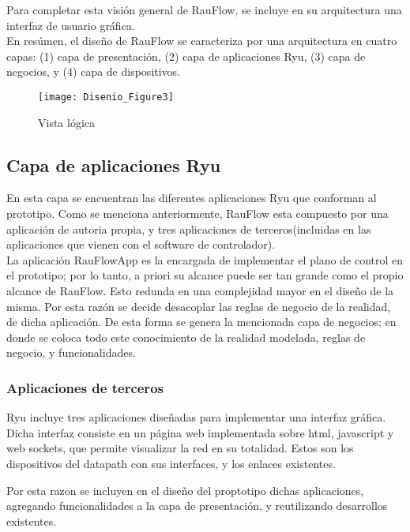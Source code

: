 Para completar esta visi\'on general de RauFlow, se incluye en su arquitectura una interfaz de usuario gr\'afica.\\ 

En res\'umen, el dise\~no de RauFlow se caracteriza por una arquitectura en cuatro capas: (1) capa de presentación, (2) capa de aplicaciones Ryu, (3) capa de negocios, y (4) capa de dispositivos.\\

\newpage
\begin{figure}[ht!] 
\centering    
\texttt{[image: Disenio\_Figure3]}
\caption[Vista l\'ogica]{Vista l\'ogica}
\label{fig:VistaComponentes2}
\end{figure}

\subsection{Capa de aplicaciones Ryu}
En esta capa se encuentran las diferentes aplicaciones Ryu que conforman al prototipo. Como se menciona anteriormente, RauFlow esta compuesto por una aplicaci\'on de autoria propia, y tres aplicaciones de terceros(incluidas en las aplicaciones que vienen con el software de controlador).\\

La aplicaci\'on RauFlowApp es la encargada de implementar el plano de control en el prototipo; por lo tanto, a priori su alcance puede ser tan grande como el propio alcance de RauFlow. Esto redunda en una complejidad mayor en el dise\~no de la misma. Por esta razón se decide desacoplar las reglas de negocio de la realidad, de dicha aplicación. De esta forma se genera la mencionada capa de negocios; en donde se coloca todo este conocimiento de la realidad modelada, reglas de negocio, y funcionalidades.  

\subsubsection{Aplicaciones de terceros}
Ryu incluye tres aplicaciones dise\~nadas para implementar una interfaz gr\'afica. Dicha interfaz consiste en un p\'agina web implementada sobre html, javascript y web sockets, que permite visualizar la red en su totalidad. Estos son los dispositivos del datapath con sus interfaces, y los enlaces existentes.

Por esta razon se incluyen en el dise\~no del proptotipo dichas aplicaciones, agregando funcionalidades  a la capa de presentaci\'on, y reutilizando desarrollos existentes.

